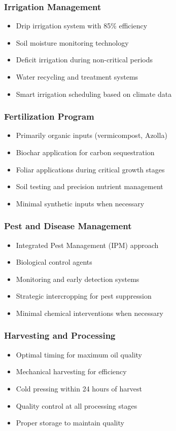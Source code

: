 \subsubsection{Irrigation Management}
\begin{itemize}
    \item Drip irrigation system with 85\% efficiency
    \item Soil moisture monitoring technology
    \item Deficit irrigation during non-critical periods
    \item Water recycling and treatment systems
    \item Smart irrigation scheduling based on climate data
\end{itemize}

\subsubsection{Fertilization Program}
\begin{itemize}
    \item Primarily organic inputs (vermicompost, Azolla)
    \item Biochar application for carbon sequestration
    \item Foliar applications during critical growth stages
    \item Soil testing and precision nutrient management
    \item Minimal synthetic inputs when necessary
\end{itemize}

\subsubsection{Pest and Disease Management}
\begin{itemize}
    \item Integrated Pest Management (IPM) approach
    \item Biological control agents
    \item Monitoring and early detection systems
    \item Strategic intercropping for pest suppression
    \item Minimal chemical interventions when necessary
\end{itemize}

\subsubsection{Harvesting and Processing}
\begin{itemize}
    \item Optimal timing for maximum oil quality
    \item Mechanical harvesting for efficiency
    \item Cold pressing within 24 hours of harvest
    \item Quality control at all processing stages
    \item Proper storage to maintain quality
\end{itemize}


